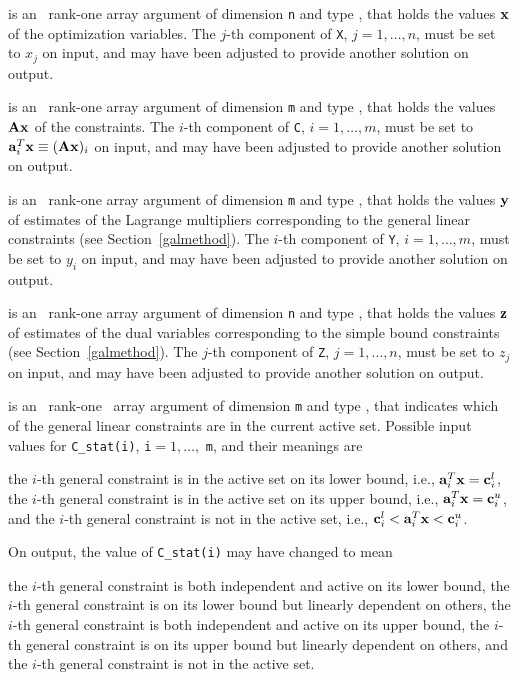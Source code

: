 \documentclass{galahad}
\begin{document}
\begin{description}
 is an \intentinout\ rank-one array argument of dimension {\tt n}
and type \realdp,
that holds the values ${\mathbf{x}}$ of the optimization variables.
The $j$-th component of {\tt X}, $j = 1,  \ldots , n$, must be set to $x_{j}$
on input, and may have been adjusted to provide another solution on output.

 is an \intentinout\ rank-one array argument of dimension {\tt m}
and type \realdp, that holds
the values ${\mathbf{A}} {\mathbf{x}}$ of the constraints.
The $i$-th component of {\tt C}, $i = 1,  \ldots ,  m$, must be set to
${\mathbf{a}}_{i}^{T}{\mathbf{x}} \equiv ({\mathbf{A}} {\mathbf{x}})_{i}$
on input, and may have been adjusted to provide another solution on output.

 is an \intentinout\ rank-one array argument of dimension {\tt m}
and type \realdp, that holds
the values ${\mathbf{y}}$ of estimates  of the Lagrange multipliers
corresponding to the general linear constraints (see Section~\ref{galmethod}).
The $i$-th component of {\tt Y}, $i = 1,  \ldots ,  m$, must be set to $y_{i}$
on input, and may have been adjusted to provide another solution on output.

 is an \intentinout\ rank-one array argument of dimension {\tt n}
and type \realdp, that holds
the values ${\mathbf{z}}$ of estimates  of the dual variables
corresponding to the simple bound constraints (see Section~\ref{galmethod}).
The $j$-th component of {\tt Z}, $j = 1,  \ldots ,  n$, must be set to $z_{j}$
on input, and may have been adjusted to provide another solution on output.

 is an \intentin\ rank-one \intentinout\ array argument of
dimension {\tt m}
and type \integer, that indicates which of the general linear
constraints are in the current active set. Possible input values for
{\tt C\_stat(i)}, {\tt i}$=1, \ldots ,$ {\tt m}, and their meanings are
\begin{description}
 the $i$-th general constraint
is in the active set on its lower bound, i.e., ${\mathbf{a}}_i^T {\mathbf{x}} = {\mathbf{c}}_i^{l}$,
 the $i$-th general constraint
is in the active set on its upper bound, i.e., ${\mathbf{a}}_i^T {\mathbf{x}} = {\mathbf{c}}_i^{u}$,
and
  the $i$-th general constraint is not in the active set,
i.e., ${\mathbf{c}}_i^{l} < {\mathbf{a}}_i^T {\mathbf{x}} < {\mathbf{c}}_i^{u}$.
\end{description}
On output, the value of {\tt C\_stat(i)} may have changed to mean
\begin{description}
 the $i$-th general constraint
is both independent and active on its lower bound,
 the $i$-th general constraint
is on its lower bound but linearly dependent on others,
 the $i$-th general constraint
is both independent and active on its upper bound,
 the $i$-th general constraint
is on its upper bound but linearly dependent on others, and
 the $i$-th general constraint is not in the active set.
\end{description}



\end{description}
\end{document}
